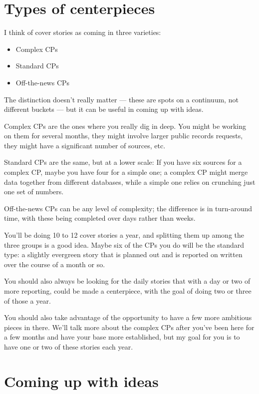\documentclass[
  11pt,
  american,
  letterpaperpaper,
  extrafontsizes,onecolumn,openright
  ]{memoir}
\providecommand{\tightlist}{%
  \setlength{\itemsep}{0pt}\setlength{\parskip}{0pt}}
\begin{document}
\hypertarget{types-of-centerpieces}{%
\section*{Types of centerpieces}\label{types-of-centerpieces}}

I think of cover stories as coming in three varieties:

\begin{itemize}
\tightlist
\item
  Complex CPs
\item
  Standard CPs
\item
  Off-the-news CPs
\end{itemize}

The distinction doesn't really matter --- these are spots on a continuum, not different buckets --- but it can be useful in coming up with ideas.

Complex CPs are the ones where you really dig in deep. You might be working on them for several months, they might involve larger public records requests, they might have a significant number of sources, etc.

Standard CPs are the same, but at a lower scale: If you have six sources for a complex CP, maybe you have four for a simple one; a complex CP might merge data together from different databases, while a simple one relies on crunching just one set of numbers.

Off-the-news CPs can be any level of complexity; the difference is in turn-around time, with these being completed over days rather than weeks.

You'll be doing 10 to 12 cover stories a year, and splitting them up among the three groups is a good idea. Maybe six of the CPs you do will be the standard type: a slightly evergreen story that is planned out and is reported on written over the course of a month or so.

You should also always be looking for the daily stories that with a day or two of more reporting, could be made a centerpiece, with the goal of doing two or three of those a year.

You should also take advantage of the opportunity to have a few more ambitious pieces in there. We'll talk more about the complex CPs after you've been here for a few months and have your base more established, but my goal for you is to have one or two of these stories each year.

\hypertarget{coming-up-with-ideas}{%
\section*{Coming up with ideas}\label{coming-up-with-ideas}}
\end{document}
